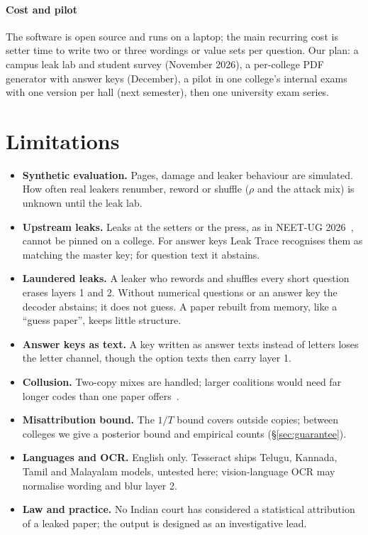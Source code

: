 \documentclass[10pt,a4paper]{article}
\theoremstyle{remark}
\begin{document}
\paragraph{Cost and pilot} The software is open source and runs on a laptop; the main recurring cost is setter time to write two or three wordings or value sets per question. Our plan: a campus leak lab and student survey (November 2026), a per-college PDF generator with answer keys (December), a pilot in one college's internal exams with one version per hall (next semester), then one university exam series.

\section{Limitations}
\label{sec:limits}
\begin{itemize}
\item \textbf{Synthetic evaluation.} Pages, damage and leaker behaviour are simulated. How often real leakers renumber, reword or shuffle ($\rho$ and the attack mix) is unknown until the leak lab.
\item \textbf{Upstream leaks.} Leaks at the setters or the press, as in NEET-UG 2026~\citep{tribune2026cbi}, cannot be pinned on a college. For answer keys Leak Trace recognises them as matching the master key; for question text it abstains.
\item \textbf{Laundered leaks.} A leaker who rewords and shuffles every short question erases layers 1 and 2. Without numerical questions or an answer key the decoder abstains; it does not guess. A paper rebuilt from memory, like a \enquote{guess paper}, keeps little structure.
\item \textbf{Answer keys as text.} A key written as answer texts instead of letters loses the letter channel, though the option texts then carry layer 1.
\item \textbf{Collusion.} Two-copy mixes are handled; larger coalitions would need far longer codes than one paper offers~\citep{tardos2008}.
\item \textbf{Misattribution bound.} The $1/T$ bound covers outside copies; between colleges we give a posterior bound and empirical counts (\S\ref{sec:guarantee}).
\item \textbf{Languages and OCR.} English only. Tesseract ships Telugu, Kannada, Tamil and Malayalam models, untested here; vision-language OCR may normalise wording and blur layer 2.
\item \textbf{Law and practice.} No Indian court has considered a statistical attribution of a leaked paper; the output is designed as an investigative lead.
\end{itemize}
\end{document}
